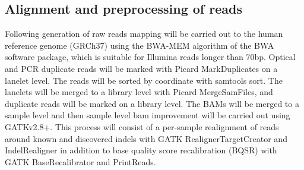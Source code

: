 \subsection{Alignment and preprocessing of reads}
Following generation of raw reads mapping will be carried out to the human reference genome (GRCh37) using the BWA-MEM algorithm of the BWA software package, which is suitable for Illumina reads longer than 70bp.\cite{2013arXiv1303.3997L} Optical and PCR duplicate reads will be marked with Picard MarkDuplicates on a lanelet level. The reads will be sorted by coordinate with samtools sort. The lanelets will be merged to a library level with Picard MergeSamFiles, and duplicate reads will be marked on a library level. The BAMs will be merged to a sample level and then sample level bam improvement will be carried out using GATKv2.8+. This process will consist of a per-sample realignment of reads around known and discovered indels with GATK RealignerTargetCreator and IndelRealigner in addition to base quality score recalibration (BQSR) with GATK BaseRecalibrator and PrintReads.